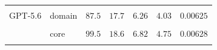 \begin{table}[H]
\begin{tabular}{ll*{5}{c}}
& & \cellcolor{llpC} & \cellcolor{llpD}{\color{llpSpread}{\scriptsize$[7.89,\,16.8]$}} & \cellcolor{llpC}{\color{llpSpread}{\scriptsize$[2.42,\,7.17]$}} & \cellcolor{llpC}{\color{llpSpread}{\scriptsize$[1.56,\,5.02]$}} & \cellcolor{llpC}{\scriptsize$[0.00488,\,0.00556]$} \\[2pt]
GPT-5.6 & domain & \cellcolor{llpC}$87.5$ & \cellcolor{llpC}$17.7$ & \cellcolor{llpC}$6.26$ & \cellcolor{llpC}$4.03$ & \cellcolor{llpA}$0.00625$ \\
& & \cellcolor{llpC}{\scriptsize$[84.2,\,91.4]$} & \cellcolor{llpC}{\scriptsize$[17.3,\,19.9]$} & \cellcolor{llpC}{\scriptsize$[5.87,\,7.38]$} & \cellcolor{llpC}{\scriptsize$[3.89,\,5.21]$} & \cellcolor{llpA}{\scriptsize$[0.00608,\,0.00647]$} \\[2pt]
 & core & \cellcolor{llpB}$99.5$ & \cellcolor{llpC}$18.6$ & \cellcolor{llpB}$6.82$ & \cellcolor{llpA}$4.75$ & \cellcolor{llpA}$0.00628$ \\
& & \cellcolor{llpB}{\scriptsize$[84.9,\,111]$} & \cellcolor{llpC}{\scriptsize$[18.0,\,21.3]$} & \cellcolor{llpB}{\scriptsize$[6.30,\,8.16]$} & \cellcolor{llpA}{\scriptsize$[4.21,\,5.26]$} & \cellcolor{llpA}{\scriptsize$[0.00573,\,0.00717]$} \\
\bottomrule
\end{tabular}
\end{table}
